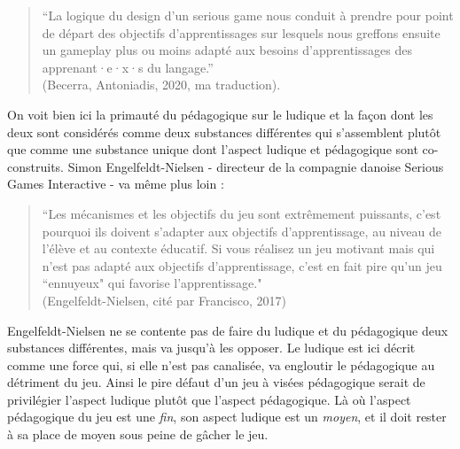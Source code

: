 \documentclass{scrartcl}
\begin{document}
		\begin{quote}
			“La logique du design d’un serious game nous conduit à prendre pour point de départ des objectifs d’apprentissages sur lesquels nous greffons ensuite un gameplay plus ou moins adapté aux besoins d’apprentissages des apprenant·e·x·s du langage.”\\
			(Becerra, Antoniadis, 2020, ma traduction).
		\end{quote} 
		On voit bien ici la primauté du pédagogique sur le ludique et la façon dont les deux sont considérés comme deux substances différentes qui s'assemblent plutôt que comme une substance unique dont l'aspect ludique et pédagogique sont co-construits. Simon Engelfeldt-Nielsen - directeur de la compagnie danoise Serious Games Interactive - va même plus loin : 
		\begin{quote}
			“Les mécanismes et les objectifs du jeu sont extrêmement puissants, c’est pourquoi ils doivent s’adapter aux objectifs d’apprentissage, au niveau de l'élève et au contexte éducatif. Si vous réalisez un jeu motivant mais qui n'est pas adapté aux objectifs d’apprentissage, c'est en fait pire qu'un jeu “ennuyeux" qui favorise l’apprentissage."\\ (Engelfeldt-Nielsen, cité par Francisco, 2017)
		\end{quote}
		Engelfeldt-Nielsen ne se contente pas de faire du ludique et du pédagogique deux substances différentes, mais va jusqu'à les opposer. Le ludique est ici décrit comme une force qui, si elle n'est pas canalisée, va engloutir le pédagogique au détriment du jeu. Ainsi le pire défaut d'un jeu à visées pédagogique serait de privilégier l'aspect ludique plutôt que l'aspect pédagogique. Là où l'aspect pédagogique du jeu est une \textit{fin}, son aspect ludique est un \textit{moyen}, et il doit rester à sa place de moyen sous peine de gâcher le jeu.\\
		
\end{document}
